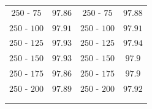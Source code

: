 \documentclass[11pt,a4paper,twoside,
openright]{book}
\begin{document}
\begin{center}
\begin{table}[]
\begin{center}
\begin{tabular}{@{}cc|cc@{}}
$250$ - $75$ & $97.86$  &  $250$ - $75$ & $97.88$ \\ [1pt]
$250$ - $100$ & $97.91$  & $250$ - $100$ & $97.91$ \\ [1pt]
$250$ - $125$ & $97.93$  & $250$ - $125$ & $97.94$ \\ [1pt]
$250$ - $150$ & $97.93$  &  $250$ - $150$ & $97.9$ \\ [1pt]
$250$ - $175$ & $97.86$  &  $250$ - $175$ & $97.9$ \\ [1pt]
$250$ - $200$ & $97.89$  & $250$ - $200$ & $97.92$ \\ [1pt]
\hline\\[-11pt]
\hline\\[-8pt]
\end{tabular}\\[5pt]
\end{center}
\normalsize
\end{table}
\end{center}
\end{document}
